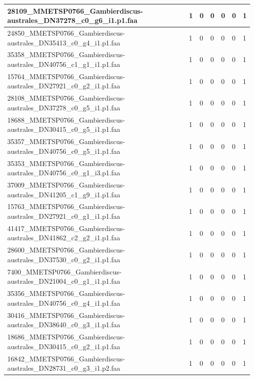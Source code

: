 \documentclass[12pt]{article}
\begin{document}
\begin{longtable}{ | p{2cm} | p{2cm} |p{2.5cm} | p{2cm} | p{2.5cm} |  p{2cm} | p{2cm} |}
 \hline 
28109\_MMETSP0766\_Gambierdiscus-australes\_DN37278\_c0\_g6\_i1.p1.faa&1&0&0&0&0&1\\ 
 \hline 
24850\_MMETSP0766\_Gambierdiscus-australes\_DN35413\_c0\_g4\_i1.p1.faa&1&0&0&0&0&1\\ 
 \hline 
35358\_MMETSP0766\_Gambierdiscus-australes\_DN40756\_c1\_g1\_i1.p1.faa&1&0&0&0&0&1\\ 
 \hline 
15764\_MMETSP0766\_Gambierdiscus-australes\_DN27921\_c0\_g2\_i1.p1.faa&1&0&0&0&0&1\\ 
 \hline 
28108\_MMETSP0766\_Gambierdiscus-australes\_DN37278\_c0\_g5\_i1.p1.faa&1&0&0&0&0&1\\ 
 \hline 
18688\_MMETSP0766\_Gambierdiscus-australes\_DN30415\_c0\_g5\_i1.p1.faa&1&0&0&0&0&1\\ 
 \hline 
35357\_MMETSP0766\_Gambierdiscus-australes\_DN40756\_c0\_g5\_i1.p1.faa&1&0&0&0&0&1\\ 
 \hline 
35353\_MMETSP0766\_Gambierdiscus-australes\_DN40756\_c0\_g1\_i3.p1.faa&1&0&0&0&0&1\\ 
 \hline 
37009\_MMETSP0766\_Gambierdiscus-australes\_DN41205\_c1\_g9\_i1.p1.faa&1&0&0&0&0&1\\ 
 \hline 
15763\_MMETSP0766\_Gambierdiscus-australes\_DN27921\_c0\_g1\_i1.p1.faa&1&0&0&0&0&1\\ 
 \hline 
41417\_MMETSP0766\_Gambierdiscus-australes\_DN41862\_c2\_g2\_i1.p1.faa&1&0&0&0&0&1\\ 
 \hline 
28600\_MMETSP0766\_Gambierdiscus-australes\_DN37530\_c0\_g2\_i1.p1.faa&1&0&0&0&0&1\\ 
 \hline 
7400\_MMETSP0766\_Gambierdiscus-australes\_DN21004\_c0\_g1\_i1.p1.faa&1&0&0&0&0&1\\ 
 \hline 
35356\_MMETSP0766\_Gambierdiscus-australes\_DN40756\_c0\_g4\_i1.p1.faa&1&0&0&0&0&1\\ 
 \hline 
30416\_MMETSP0766\_Gambierdiscus-australes\_DN38640\_c0\_g3\_i1.p1.faa&1&0&0&0&0&1\\ 
 \hline 
18686\_MMETSP0766\_Gambierdiscus-australes\_DN30415\_c0\_g2\_i1.p1.faa&1&0&0&0&0&1\\ 
 \hline 
16842\_MMETSP0766\_Gambierdiscus-australes\_DN28731\_c0\_g3\_i1.p2.faa&1&0&0&0&0&1\\ 
 \hline 
\end{longtable}


\newpage


\end{document}
